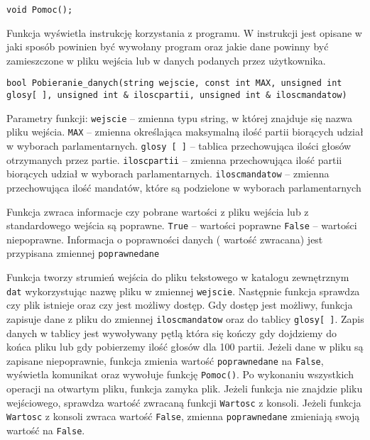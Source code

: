 \documentclass[12pt,a4paper]{article}
\begin{document}
\begin{lstlisting}
void Pomoc();
\end{lstlisting} 
Funkcja wyświetla instrukcję korzystania z programu. W instrukcji jest opisane w jaki sposób powinien być wywołany program oraz jakie dane powinny być zamieszczone w pliku wejścia lub w danych podanych przez użytkownika.

\begin{lstlisting}
bool Pobieranie_danych(string wejscie, const int MAX, unsigned int glosy[ ], unsigned int & iloscpartii, unsigned int & iloscmandatow)
\end{lstlisting}

Parametry funkcji: \newline
\texttt{wejscie} -- zmienna typu string, w której znajduje się nazwa pliku wejścia. \texttt{MAX} -- zmienna określająca maksymalną ilość partii biorących udział w wyborach parlamentarnych. \texttt{glosy [ ]} -- tablica przechowująca ilości głosów otrzymanych przez partie. \texttt{iloscpartii} -- zmienna przechowująca ilość partii biorących udział w wyborach parlamentarnych. \texttt{iloscmandatow} -- zmienna przechowująca ilość mandatów, które są podzielone w wyborach parlamentarnych \newline

Funkcja zwraca informacje czy pobrane wartości z pliku wejścia lub z standardowego wejścia są poprawne. \texttt{True} -- wartości poprawne \texttt{False} -- wartości niepoprawne. Informacja o poprawności danych ( wartość zwracana) jest przypisana zmiennej \texttt{poprawnedane}  \newline

Funkcja tworzy strumień wejścia do pliku tekstowego w katalogu zewnętrznym \texttt{dat} wykorzystując nazwę pliku w zmiennej \texttt{wejscie}. Następnie funkcja sprawdza czy plik istnieje oraz czy jest możliwy dostęp. Gdy dostęp jest możliwy, funkcja zapisuje dane z pliku do zmiennej \texttt{iloscmandatow} oraz do tablicy \texttt{glosy[ ]}. Zapis danych w tablicy jest wywoływany pętlą która się kończy gdy dojdziemy do końca pliku lub gdy pobierzemy ilość głosów dla 100 partii. Jeżeli dane w pliku są zapisane niepoprawnie, funkcja zmienia wartość \texttt{poprawnedane} na \texttt{False}, wyświetla komunikat oraz wywołuje funkcję \texttt{Pomoc()}. Po wykonaniu wszystkich operacji na otwartym pliku, funkcja zamyka plik.
\newline
Jeżeli funkcja nie znajdzie pliku wejściowego, sprawdza wartość zwracaną funkcji \texttt{Wartosc} z konsoli. Jeżeli funkcja \texttt{Wartosc} z konsoli zwraca wartość \texttt{False}, zmienna \texttt{poprawnedane} zmieniają swoją wartość na \texttt{False}.
\end{document}
